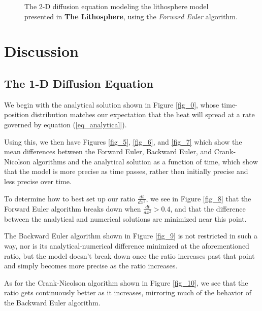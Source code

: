 \documentclass[a4paper,10pt,english]{article}
\begin{document}
\begin{figure}[H]
    \caption{The 2-D diffusion equation modeling the lithosphere model presented in \textbf{The Lithosphere}, using the \textit{Forward Euler} algorithm.\label{fig_4}}
\end{figure}

\section*{Discussion}

\subsection*{The 1-D Diffusion Equation}

We begin with the analytical solution shown in Figure \ref{fig_0}, whose time-position distribution matches our expectation that the heat will spread at a rate governed by equation (\ref{eq_analytical}).

Using this, we then have Figures \ref{fig_5}, \ref{fig_6}, and \ref{fig_7} which show the mean differences between the Forward Euler, Backward Euler, and Crank-Nicolson algorithms and the analytical solution as a function of time, which show that the model is more precise as time passes, rather then initially precise and less precise over time.

To determine how to best set up our ratio $\frac{dt}{dx^2}$, we see in Figure \ref{fig_8} that the Forward Euler algorithm breaks down when $\frac{dt}{dx^2} > 0.4$, and that the difference between the analytical and numerical solutions are minimized near this point.  

The Backward Euler algorithm shown in Figure \ref{fig_9} is not restricted in such a way, nor is its analytical-numerical difference minimized at the aforementioned ratio, but the model doesn't break down once the ratio increases past that point and simply becomes more precise as the ratio increases.

As for the Crank-Nicolson algorithm shown in Figure \ref{fig_10}, we see that the ratio gets continuously better as it increases, mirroring much of the behavior of the Backward Euler algorithm.
\end{document}

